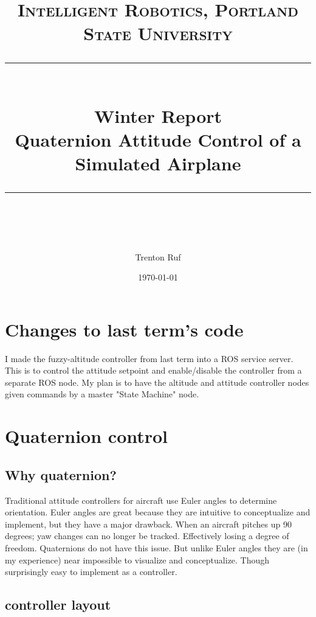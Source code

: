 \documentclass[11pt]{scrartcl} %
\title{	
	\normalfont\normalsize
	\textsc{Intelligent Robotics, Portland State University}\\ %
	\vspace{25pt} %
	\rule{\linewidth}{0.5pt}\\ %
	\vspace{20pt} %
	{\huge Winter Report}\\ %
	\vspace{4pt} %
	{\large Quaternion Attitude Control of a Simulated Airplane}\\ %
	\vspace{12pt} %
	\rule{\linewidth}{2pt}\\ %
	\vspace{12pt} %
}
\author{\LARGE Trenton Ruf} %
\date{\normalsize \today} %
\begin{document}
\maketitle %




\renewcommand\thesubsection{\Roman{subsection}}
\section{Changes to last term's code}
I made the fuzzy-altitude controller from last term into a ROS service server. This is to control the attitude setpoint and enable/disable the controller from a separate ROS node. My plan is to have the altitude and attitude controller nodes given commands by a master "State Machine" node.


\section{Quaternion control}

\subsection{Why quaternion?}
Traditional attitude controllers for aircraft use Euler angles to determine orientation. Euler angles are great because they are intuitive to conceptualize and implement, but they have a major drawback. When an aircraft pitches up 90 degrees; yaw changes can no longer be tracked. Effectively losing a degree of freedom. Quaternions do not have this issue. But unlike Euler angles they are (in my experience) near impossible to visualize and conceptualize. Though surprisingly easy to implement as a controller.

\subsection{controller layout}
\end{document}
